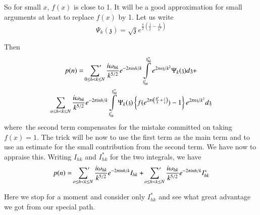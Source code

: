 So for small $x$, $f(x)$ is close to 1. It will be a good
approximation for small arguments at least to replace $f(x)$ by 1. Let
us write
$$
\Psi_k (\mathfrak{z}) = \sqrt{\mathfrak{z}} e^{\frac{\pi}{2}
  \left(\frac{1}{\mathfrak{z}} -\frac{\mathfrak{z}}{k^2}  \right)} 
$$

Then 
\begin{multline*}
  p(n) = \sideset{}{'}\sum_{0 \leq h < k\leq N} \frac{i \omega_{hk}}{k^{5/2}} e^{-
  2 \pi in h/k} \int\limits^{\mathfrak{z}''_{hk}}_{\mathfrak{z}'_{hk}}
  e^{2\pi n \mathfrak{z}/k^2} \Psi_k (\mathfrak{z})
  d \mathfrak{z} +\\
  \sum_{o \leq h< k \leq N} \frac{ i \omega_{hk}}{k^{5/2}} e^{- 2 \pi
    i n h/k} \int\limits^{\mathfrak{z}''_{hk}}_{\mathfrak{z}'_{hk}}
  \Psi_k (\mathfrak{z}) \left\{ f(e^{2 \pi i \left( \frac{h'}{k} +
    \frac{i}{\mathfrak{z}}\right)}) -1 \right\}  e^{2 \pi n
    \mathfrak{z}/k^2} d \mathfrak{z}
\end{multline*}
where\pageoriginale\ the second term compensates for the mistake
committed on taking $f(x)=1$. The trick will be now to use the first
term as the main term and to use an estimate for the small
contribution from the second term. We have now to appraise
this. Writing $I_{hk}$ and $I^*_{hk}$ for the two integrals, we have
$$
p(n) = \sideset{}{'}\sum_{o \leq h < k \leq N} \frac{i \omega_{hk}}{k^{5/2}} e^{-
  2 \pi i n h/k} I_{hk} + \sideset{}{'}\sum_{o \leq h < k\leq N} \frac{i
  \omega_{hk}}{k^{5/2}} e^{- 2 \pi i n h/k} I^*_{hk}
$$

Here we stop for a moment and consider only $I^*_{hk}$ and see what
great advantage we got from our special path.
\begin{figure}[H]
\end{figure}

